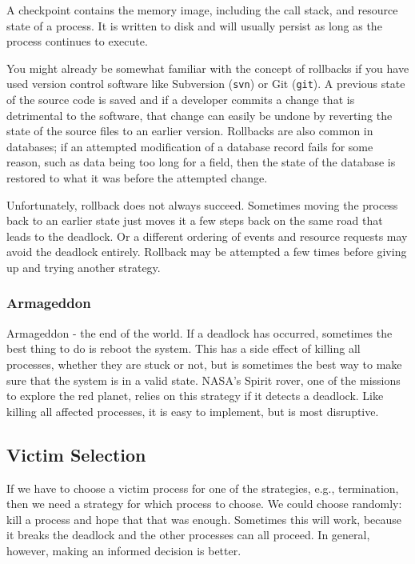 \documentclass[a4paper]{report}
\begin{document}
A checkpoint contains the memory image, including the call stack, and resource state of a process. It is written to disk and will usually persist as long as the process continues to execute.

You might already be somewhat familiar with the concept of rollbacks if you have used version control software like Subversion (\texttt{svn}) or Git (\texttt{git}). A previous state of the source code is saved and if a developer commits a change that is detrimental  to the software, that change can easily be undone by reverting the state of the source files to an earlier version. Rollbacks are also common in databases; if an attempted modification of a database record fails for some reason, such as data being too long for a field, then the state of the database is restored to what it was before the attempted change.

Unfortunately, rollback does not always succeed. Sometimes moving the process back to an earlier state just moves it a few steps back on the same road that leads to the deadlock.  Or a different ordering of events and resource requests may avoid the deadlock entirely. Rollback may be attempted a few times before giving up and trying another strategy.


\subsubsection*{Armageddon}
Armageddon - the end of the world. If a deadlock has occurred, sometimes the best thing to do is reboot the system. This has a side effect of killing all processes, whether they are stuck or not, but is sometimes the best way to make sure that the system is in a valid state. NASA's Spirit rover, one of the missions to explore the red planet, relies on this strategy if it detects a deadlock. Like killing all affected processes, it is easy to implement, but is most disruptive.


\subsection*{Victim Selection}
If we have to choose a victim process for one of the strategies, e.g., termination, then we need a strategy for which process to choose. We could choose randomly: kill a process and hope that that was enough. Sometimes this will work, because it breaks the deadlock and the other processes can all proceed. In general, however, making an informed decision is better.
\end{document}
